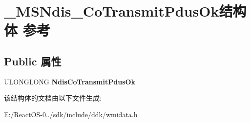 \hypertarget{struct___m_s_ndis___co_transmit_pdus_ok}{}\section{\+\_\+\+M\+S\+Ndis\+\_\+\+Co\+Transmit\+Pdus\+Ok结构体 参考}
\label{struct___m_s_ndis___co_transmit_pdus_ok}
\subsection*{Public 属性}
\begin{DoxyCompactItemize}
\item 
\mbox{\label{struct___m_s_ndis___co_transmit_pdus_ok_add9895d034b907eab3abccfe5f2c9e3b}} 
U\+L\+O\+N\+G\+L\+O\+NG {\bfseries Ndis\+Co\+Transmit\+Pdus\+Ok}
\end{DoxyCompactItemize}


该结构体的文档由以下文件生成\+:\begin{DoxyCompactItemize}
\item 
E\+:/\+React\+O\+S-\/0../sdk/include/ddk/wmidata.\+h\end{DoxyCompactItemize}
